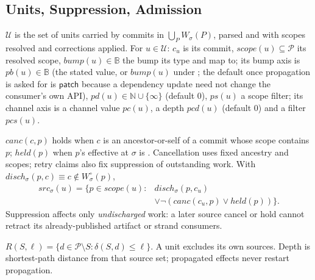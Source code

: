 \subsection{Units, Suppression, Admission}

\begin{definition}[units]
$\mathcal{U}$ is the set of units carried by commits in
$\bigcup_P W_\sigma(P)$, parsed and with scopes resolved and corrections
applied. For $u \in \mathcal{U}$: $c_u$ is its commit,
$\mathit{scope}(u) \subseteq \mathcal{P}$ its resolved scope,
$\mathit{bump}(u) \in \mathbb{B}$ the bump its type and \code{!} map to;
its bump axis is $\mathit{pb}(u) \in \mathbb{B}$ (the stated value, or
$\mathit{bump}(u)$ under ; the default once propagation is
asked for is $\mathsf{patch}$ because a dependency update need not
change the consumer's own API), $\mathit{pd}(u) \in \mathbb{N} \cup
\{\infty\}$ (default $0$), $\mathit{ps}(u)$ a scope filter; its channel
axis is a channel value $\mathit{pc}(u)$, a depth $\mathit{pcd}(u)$
(default $0$) and a filter $\mathit{pcs}(u)$.
\end{definition}

\begin{definition}
\label{def:src}
$\mathit{canc}(c,p)$ holds when $c$ is an ancestor-or-self of a
 commit whose scope contains $p$; $\mathit{held}(p)$ when
$p$'s effective  at $\sigma$ is .
Cancellation uses fixed ancestry and scopes; retry claims also fix suppression
of outstanding work. With $\mathit{disch}_\sigma(p,c)
\equiv c \notin W^\circ_\sigma(p)$,
\begin{equation}
\begin{aligned}
  \mathit{src}_\sigma(u) = \{ p \in \mathit{scope}(u) : {}&
    \mathit{disch}_\sigma(p,c_u) \\
    &\lor\lnot(\mathit{canc}(c_u,p) \lor \mathit{held}(p)) \}.
\end{aligned}
  \label{eq:src}
\end{equation}
Suppression affects only \emph{undischarged} work: a later source cancel or
hold cannot retract its already-published artifact or strand consumers.
\end{definition}

\begin{definition}[reach]
\label{def:reach}
$R(S,\ell) = \{ d \in \mathcal{P} \setminus S : \delta(S,d) \leq \ell
\}$. A unit excludes its own sources. Depth is shortest-path distance from
that source set; propagated effects never restart propagation.
\end{definition}

